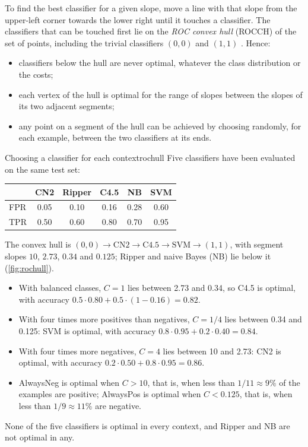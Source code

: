 To find the best classifier for a given slope, move a line with that slope from the
upper-left corner towards the lower right until it touches a classifier. The classifiers that
can be touched first lie on the \emph{ROC convex hull} (ROCCH) of the set of points, including
the trivial classifiers $(0,0)$ and $(1,1)$ \citep{provost2001robust}. Hence:
\begin{itemize}
  \item classifiers below the hull are never optimal, whatever the class distribution or the
        costs;
  \item each vertex of the hull is optimal for the range of slopes between the slopes of its
        two adjacent segments;
  \item any point on a segment of the hull can be achieved by choosing randomly, for each
        example, between the two classifiers at its ends.
\end{itemize}

\begin{example}{Choosing a classifier for each context}{rochull}
Five classifiers have been evaluated on the same test set:
\begin{center}\small
\begin{tabular}{@{}lccccc@{}}
\toprule
& CN2 & Ripper & C4.5 & NB & SVM\\
\midrule
FPR\index{false positive rate} & 0.05 & 0.10 & 0.16 & 0.28 & 0.60\\
TPR\index{true positive rate} & 0.50 & 0.60 & 0.80 & 0.70 & 0.95\\
\bottomrule
\end{tabular}
\end{center}
The convex hull is $(0,0)\to\text{CN2}\to\text{C4.5}\to\text{SVM}\to(1,1)$, with segment slopes
$10$, $2.73$, $0.34$ and $0.125$; Ripper and naive Bayes (NB) lie below it (\cref{fig:rochull}).
\begin{itemize}
  \item With balanced classes, $C=1$ lies between 2.73 and 0.34, so C4.5 is optimal, with
        accuracy $0.5\cdot0.80+0.5\cdot(1-0.16)=0.82$.
  \item With four times more positives than negatives, $C=1/4$ lies between 0.34 and 0.125:
        SVM is optimal, with accuracy $0.8\cdot0.95+0.2\cdot0.40=0.84$.
  \item With four times more negatives, $C=4$ lies between 10 and 2.73: CN2 is optimal, with
        accuracy $0.2\cdot0.50+0.8\cdot0.95=0.86$.
  \item AlwaysNeg is optimal when $C>10$, that is, when less than $1/11\approx9\%$ of the
        examples are positive; AlwaysPos is optimal when $C<0.125$, that is, when less than
        $1/9\approx11\%$ are negative.
\end{itemize}
None of the five classifiers is optimal in every context, and Ripper and NB are not optimal in any.
\end{example}

